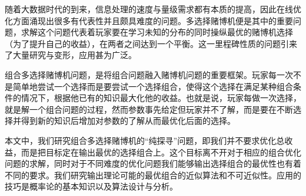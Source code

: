 
 

\makeatletter
\ifthu@bachelor\relax\else
  \ifthu@doctor
  \else
    \ifthu@master
    \fi
  \fi
\fi
\makeatother




\begin{cabstract}
随着大数据时代的到来，信息处理的速度与量级需求都有本质的提高，因此在线优化方面涌现出很多有代表性并且颇具难度的问题。多选择赌博机便是其中的重要问题，求解这个问题代表着玩家要在学习未知的分布的同时操纵最优的赌博机选择（为了提升自己的收益），在两者之间达到一个平衡。这一里程碑性质的问题引来了大量研究与变形，应用甚为广泛。

组合多选择赌博机问题，是将组合问题融入赌博机问题的重要框架。玩家每一次不是简单地尝试一个选择而是要尝试一个选择组合，使得这个选择在满足某种组合条件的情况下，根据他已有的知识最大化他的收益。也就是说，玩家每做一次选择，就是解一个组合问题的过程，然而参数事先给定但玩家并不了解，而是要在不断选择并得到新的知识后增加对参数的了解从而最优化后面的选择。

本文中，我们研究组合多选择赌博机的“纯探寻”问题，即我们并不要求优化总收益，而是把目标定在输出最优的选择组合上。这个目标离不开对于相应的组合优化问题的求解，同时对于不同难度的优化问题我们能够输出选择组合的最优性也有着不同的要求。我们研究输出理论可能的最优组合的近似算法和不可近似性。应用的技巧是概率论的基本知识以及算法设计与分析。

\end{cabstract}


